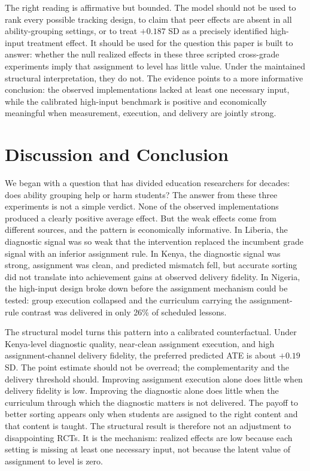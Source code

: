 \documentclass[11pt]{article}
\begin{document}
The right reading is affirmative but bounded. The model should not be used to rank every possible tracking design, to claim that peer effects are absent in all ability-grouping settings, or to treat $+0.187$ SD as a precisely identified high-input treatment effect. It should be used for the question this paper is built to answer: whether the null realized effects in these three scripted cross-grade experiments imply that assignment to level has little value. Under the maintained structural interpretation, they do not. The evidence points to a more informative conclusion: the observed implementations lacked at least one necessary input, while the calibrated high-input benchmark is positive and economically meaningful when measurement, execution, and delivery are jointly strong.

\section{Discussion and Conclusion}
\label{sec:conclusion}

We began with a question that has divided education researchers for decades: does ability grouping help or harm students? The answer from these three experiments is not a simple verdict. None of the observed implementations produced a clearly positive average effect. But the weak effects come from different sources, and the pattern is economically informative. In Liberia, the diagnostic signal was so weak that the intervention replaced the incumbent grade signal with an inferior assignment rule. In Kenya, the diagnostic signal was strong, assignment was clean, and predicted mismatch fell, but accurate sorting did not translate into achievement gains at observed delivery fidelity. In Nigeria, the high-input design broke down before the assignment mechanism could be tested: group execution collapsed and the curriculum carrying the assignment-rule contrast was delivered in only 26\% of scheduled lessons.

The structural model turns this pattern into a calibrated counterfactual. Under Kenya-level diagnostic quality, near-clean assignment execution, and high assignment-channel delivery fidelity, the preferred predicted ATE is about $+0.19$ SD. The point estimate should not be overread; the complementarity and the delivery threshold should. Improving assignment execution alone does little when delivery fidelity is low. Improving the diagnostic alone does little when the curriculum through which the diagnostic matters is not delivered. The payoff to better sorting appears only when students are assigned to the right content and that content is taught. The structural result is therefore not an adjustment to disappointing RCTs. It is the mechanism: realized effects are low because each setting is missing at least one necessary input, not because the latent value of assignment to level is zero.
\end{document}
